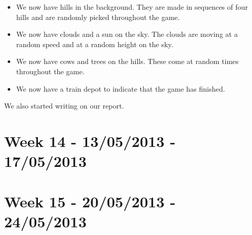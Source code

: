 \begin{itemize}
\item We now have hills in the background. They are made in sequences of four hills and are randomly picked throughout the game. 
\item We now have clouds and a sun on the sky. The clouds are moving at a random speed and at a random height on the sky. 
\item We now have cows and trees on the hills. These come at random times throughout the game.
\item We now have a train depot to indicate that the game has finished. 
\end{itemize}
We also started writing on our report. 

\section*{Week 14 - 13/05/2013 - 17/05/2013}
\section*{Week 15 - 20/05/2013 - 24/05/2013}
